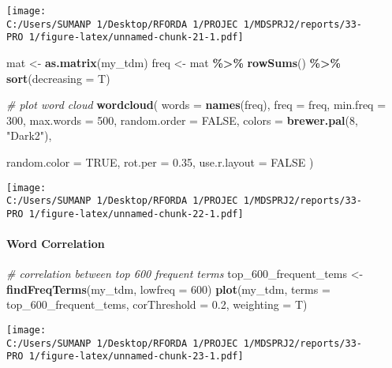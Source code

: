 \documentclass[
]{article}
\newenvironment{Shaded}{\begin{snugshade}}{\end{snugshade}}
\newcommand{\AttributeTok}[1]{\textcolor[rgb]{0.13,0.29,0.53}{#1}}
\newcommand{\CommentTok}[1]{\textcolor[rgb]{0.56,0.35,0.01}{\textit{#1}}}
\newcommand{\ConstantTok}[1]{\textcolor[rgb]{0.56,0.35,0.01}{#1}}
\newcommand{\DecValTok}[1]{\textcolor[rgb]{0.00,0.00,0.81}{#1}}
\newcommand{\FloatTok}[1]{\textcolor[rgb]{0.00,0.00,0.81}{#1}}
\newcommand{\FunctionTok}[1]{\textcolor[rgb]{0.13,0.29,0.53}{\textbf{#1}}}
\newcommand{\NormalTok}[1]{#1}
\newcommand{\OtherTok}[1]{\textcolor[rgb]{0.56,0.35,0.01}{#1}}
\newcommand{\SpecialCharTok}[1]{\textcolor[rgb]{0.81,0.36,0.00}{\textbf{#1}}}
\newcommand{\StringTok}[1]{\textcolor[rgb]{0.31,0.60,0.02}{#1}}
\begin{document}
\texttt{[image: C:/Users/SUMANP~1/Desktop/RFORDA~1/PROJEC~1/MDSPRJ2/reports/33-PRO~1/figure-latex/unnamed-chunk-21-1.pdf]}

\begin{Shaded}
\begin{Highlighting}[]
\NormalTok{mat }\OtherTok{\textless{}{-}} \FunctionTok{as.matrix}\NormalTok{(my\_tdm)}
\NormalTok{freq }\OtherTok{\textless{}{-}}\NormalTok{ mat }\SpecialCharTok{\%\textgreater{}\%} \FunctionTok{rowSums}\NormalTok{() }\SpecialCharTok{\%\textgreater{}\%} \FunctionTok{sort}\NormalTok{(}\AttributeTok{decreasing =}\NormalTok{ T)}

\CommentTok{\# plot word cloud}
\FunctionTok{wordcloud}\NormalTok{(}
  \AttributeTok{words =} \FunctionTok{names}\NormalTok{(freq),}
  \AttributeTok{freq =}\NormalTok{ freq,}
  \AttributeTok{min.freq =} \DecValTok{300}\NormalTok{,}
  \AttributeTok{max.words =} \DecValTok{500}\NormalTok{,}
  \AttributeTok{random.order =} \ConstantTok{FALSE}\NormalTok{,}
  \AttributeTok{colors =} \FunctionTok{brewer.pal}\NormalTok{(}\DecValTok{8}\NormalTok{, }\StringTok{"Dark2"}\NormalTok{),}
  
  \AttributeTok{random.color =} \ConstantTok{TRUE}\NormalTok{,}
  \AttributeTok{rot.per =} \FloatTok{0.35}\NormalTok{,}
  \AttributeTok{use.r.layout =} \ConstantTok{FALSE}
\NormalTok{)}
\end{Highlighting}
\end{Shaded}

\texttt{[image: C:/Users/SUMANP~1/Desktop/RFORDA~1/PROJEC~1/MDSPRJ2/reports/33-PRO~1/figure-latex/unnamed-chunk-22-1.pdf]}

\hypertarget{word-correlation}{%
\paragraph{Word Correlation}\label{word-correlation}}

\begin{Shaded}
\begin{Highlighting}[]
\CommentTok{\# correlation between top 600 frequent terms}
\NormalTok{top\_600\_frequent\_tems }\OtherTok{\textless{}{-}} \FunctionTok{findFreqTerms}\NormalTok{(my\_tdm, }\AttributeTok{lowfreq =} \DecValTok{600}\NormalTok{)}
\FunctionTok{plot}\NormalTok{(my\_tdm, }\AttributeTok{terms =}\NormalTok{ top\_600\_frequent\_tems, }\AttributeTok{corThreshold =} \FloatTok{0.2}\NormalTok{, }\AttributeTok{weighting =}\NormalTok{ T)}
\end{Highlighting}
\end{Shaded}

\texttt{[image: C:/Users/SUMANP~1/Desktop/RFORDA~1/PROJEC~1/MDSPRJ2/reports/33-PRO~1/figure-latex/unnamed-chunk-23-1.pdf]}
\end{document}
